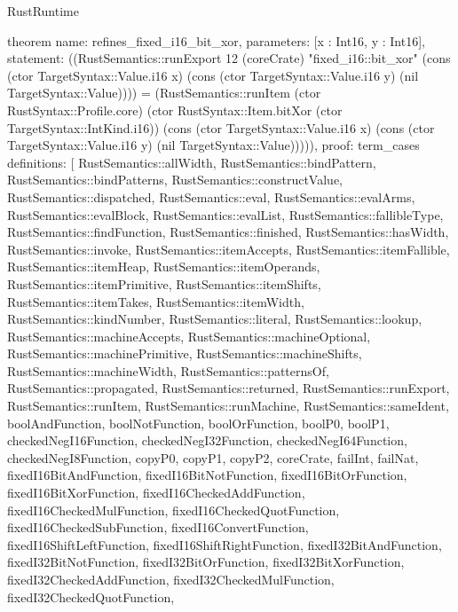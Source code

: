\begin{lexlean}{RustRuntime}
\begin{semanticmodule}
theorem{
  name: refines_fixed_i16_bit_xor,
  parameters: [x : Int16, y : Int16],
  statement: ((RustSemantics::runExport 12 (coreCrate) "fixed_i16::bit_xor" (cons (ctor TargetSyntax::Value.i16 x) (cons (ctor TargetSyntax::Value.i16 y) (nil TargetSyntax::Value)))) = (RustSemantics::runItem (ctor RustSyntax::Profile.core) (ctor RustSyntax::Item.bitXor (ctor TargetSyntax::IntKind.i16)) (cons (ctor TargetSyntax::Value.i16 x) (cons (ctor TargetSyntax::Value.i16 y) (nil TargetSyntax::Value))))),
  proof: term_cases{
    definitions: [
      RustSemantics::allWidth,
      RustSemantics::bindPattern,
      RustSemantics::bindPatterns,
      RustSemantics::constructValue,
      RustSemantics::dispatched,
      RustSemantics::eval,
      RustSemantics::evalArms,
      RustSemantics::evalBlock,
      RustSemantics::evalList,
      RustSemantics::fallibleType,
      RustSemantics::findFunction,
      RustSemantics::finished,
      RustSemantics::hasWidth,
      RustSemantics::invoke,
      RustSemantics::itemAccepts,
      RustSemantics::itemFallible,
      RustSemantics::itemHeap,
      RustSemantics::itemOperands,
      RustSemantics::itemPrimitive,
      RustSemantics::itemShifts,
      RustSemantics::itemTakes,
      RustSemantics::itemWidth,
      RustSemantics::kindNumber,
      RustSemantics::literal,
      RustSemantics::lookup,
      RustSemantics::machineAccepts,
      RustSemantics::machineOptional,
      RustSemantics::machinePrimitive,
      RustSemantics::machineShifts,
      RustSemantics::machineWidth,
      RustSemantics::patternsOf,
      RustSemantics::propagated,
      RustSemantics::returned,
      RustSemantics::runExport,
      RustSemantics::runItem,
      RustSemantics::runMachine,
      RustSemantics::sameIdent,
      boolAndFunction,
      boolNotFunction,
      boolOrFunction,
      boolP0,
      boolP1,
      checkedNegI16Function,
      checkedNegI32Function,
      checkedNegI64Function,
      checkedNegI8Function,
      copyP0,
      copyP1,
      copyP2,
      coreCrate,
      failInt,
      failNat,
      fixedI16BitAndFunction,
      fixedI16BitNotFunction,
      fixedI16BitOrFunction,
      fixedI16BitXorFunction,
      fixedI16CheckedAddFunction,
      fixedI16CheckedMulFunction,
      fixedI16CheckedQuotFunction,
      fixedI16CheckedSubFunction,
      fixedI16ConvertFunction,
      fixedI16ShiftLeftFunction,
      fixedI16ShiftRightFunction,
      fixedI32BitAndFunction,
      fixedI32BitNotFunction,
      fixedI32BitOrFunction,
      fixedI32BitXorFunction,
      fixedI32CheckedAddFunction,
      fixedI32CheckedMulFunction,
      fixedI32CheckedQuotFunction,
}}
\end{semanticmodule}
\end{lexlean}
